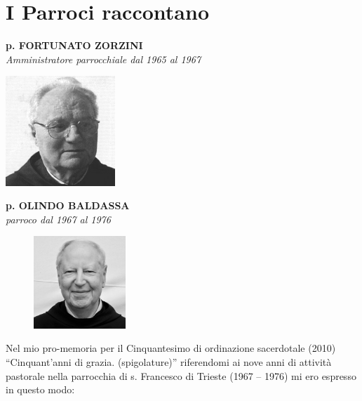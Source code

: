 \chapter{I Parroci raccontano}
\label{chap:Testimonianze}

\begin{center}
\textbf{\Large p. FORTUNATO ZORZINI}\\
	\textit{Amministratore parrocchiale dal 1965 al 1967}
\end{center}
\includegraphics[width=0.31\textwidth]{immagini/zorzini.jpg}
\bigskip
\begin{center}
\textbf{\Large p. OLINDO BALDASSA}\\
	\textit{parroco dal 1967 al 1976}
\end{center}
\bigbreak
\begingroup
\setlength\intextsep{0pt}
\begin{figure}
\centering
\includegraphics[width=0.31\textwidth]{immagini/olindo.jpg}
\end{figure}
\noindent Nel mio pro-memoria per il Cinquantesimo di ordinazione sacerdotale (2010) “Cinquant’anni di grazia. (spigolature)” riferendomi ai nove anni di attività pastorale nella parrocchia di s. Francesco di Trieste (1967 – 1976) mi ero espresso in questo modo:
\bigbreak
